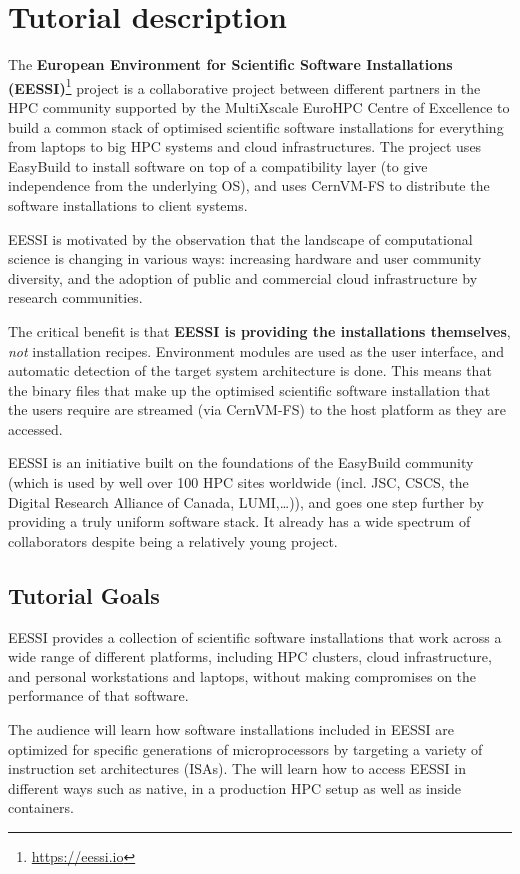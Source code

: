 \section*{Tutorial description}

The \textbf{European Environment for Scientific Software Installations
(EESSI)}\footnote{\href{https://eessi.io}{https://eessi.io}} project is a collaborative project
between different partners in the HPC community supported by the MultiXscale EuroHPC Centre of Excellence to build a
common stack of optimised scientific software installations for everything from laptops to big HPC systems and cloud
infrastructures.
The project uses EasyBuild to install software on top of a compatibility layer (to give independence from the underlying
OS), and uses CernVM-FS to
distribute the software installations to client systems.

EESSI is motivated by the observation that the landscape of computational science is changing in
various ways: increasing hardware and user community diversity, and the adoption of public and commercial cloud
infrastructure by research communities.

The critical benefit is that \textbf{EESSI is providing the
installations themselves}, \textit{not} installation recipes.
Environment modules are used as the user interface, and automatic
detection of the target system architecture is done.
This means that the binary files that make up the optimised
scientific software installation that the users require are streamed (via CernVM-FS) to the host
platform as they are accessed.

EESSI is an initiative built on the foundations of the EasyBuild community (which is used by well over
100 HPC sites worldwide (incl. JSC, CSCS, the Digital Research Alliance of Canada, LUMI,\ldots)), and goes one
step further by providing a truly uniform software stack.
It already has a wide spectrum of collaborators despite being a relatively young project.

\subsection*{Tutorial Goals}

EESSI provides a collection of scientific software installations that work across a wide range of
different platforms, including HPC clusters, cloud infrastructure, and personal workstations and laptops, without making
compromises on the performance of that software.

The audience will learn how software installations included in EESSI are optimized for specific generations
of microprocessors by targeting a
variety of instruction set architectures (ISAs). The will learn how to access EESSI in different ways such as native,
in a production HPC setup as well as inside containers.

